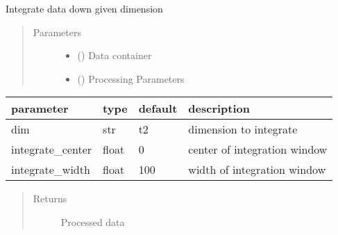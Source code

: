 \documentclass[letterpaper,10pt,english]{sphinxmanual}
\begin{document}
\begin{fulllineitems}
\label{\detokenize{dnpNMR:dnpLab.dnpNMR.integrate}}
Integrate data down given dimension
\begin{quote}\begin{description}
\item[{Parameters}] \leavevmode\begin{itemize}
\item {} 
 ({\hyperref[\detokenize{dnpData:dnpLab.dnpdata}]{}}\sphinxstyleliteralemphasis{\sphinxupquote{,}}) \sphinxhyphen{}\sphinxhyphen{} Data container

\item {} 
 (\sphinxstyleliteralemphasis{\sphinxupquote{, }}) \sphinxhyphen{}\sphinxhyphen{} Processing Parameters

\end{itemize}

\end{description}\end{quote}


\begin{savenotes}\sphinxattablestart
\centering
\begin{tabulary}{\linewidth}[t]{|T|T|T|T|}
\hline

parameter
&
type
&
default
&
description
\\
\hline
dim
&
str
&
\textquotesingle{}t2\textquotesingle{}
&
dimension to integrate
\\
\hline
integrate\_center
&
float
&
0
&
center of integration window
\\
\hline
integrate\_width
&
float
&
100
&
width of integration window
\\
\hline
\end{tabulary}
\par
\sphinxattableend\end{savenotes}
\begin{quote}\begin{description}
\item[{Returns}] \leavevmode
Processed data


\end{description}
\end{quote}
\end{fulllineitems}
\end{document}
